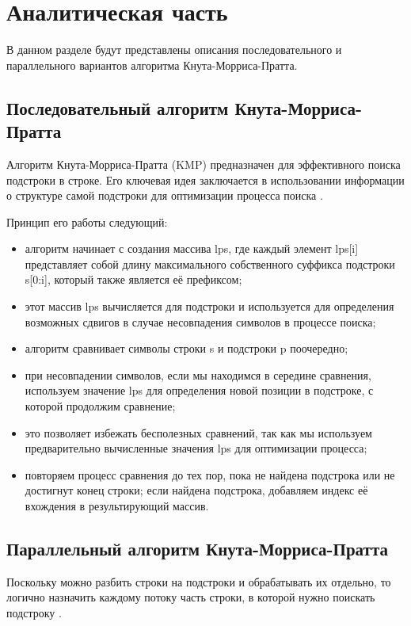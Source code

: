 \chapter{Аналитическая часть}

В данном разделе будут представлены описания последовательного и параллельного вариантов алгоритма Кнута-Морриса-Пратта.

\section{Последовательный алгоритм Кнута-Морриса-Пратта}
Алгоритм Кнута-Морриса-Пратта (KMP) предназначен для эффективного поиска подстроки в строке.
Его ключевая идея заключается в использовании информации о структуре самой подстроки для оптимизации процесса поиска \cite{kmp}.

Принцип его работы следующий:
\begin{itemize}
	\item алгоритм начинает с создания массива lps, где каждый элемент lps[i] представляет собой длину максимального собственного суффикса подстроки s[0:i], который также является её префиксом;
	\item этот массив lps вычисляется для подстроки и используется для определения возможных сдвигов в случае несовпадения символов в процессе поиска;
	\item алгоритм сравнивает символы строки s и подстроки p поочередно;
	\item при несовпадении символов, если мы находимся в середине сравнения, используем значение lps для определения новой позиции в подстроке, с которой продолжим сравнение;
	\item это позволяет избежать бесполезных сравнений, так как мы используем предварительно вычисленные значения lps для оптимизации процесса;
	\item повторяем процесс сравнения до тех пор, пока не найдена подстрока или не достигнут конец строки;
	если найдена подстрока, добавляем индекс её вхождения в результирующий массив.
\end{itemize}

\section{Параллельный алгоритм Кнута-Морриса-Пратта}
Поскольку можно разбить строки на подстроки и обрабатывать их отдельно, то логично назначить каждому потоку часть строки, в которой нужно поискать подстроку \cite{parallel}.

